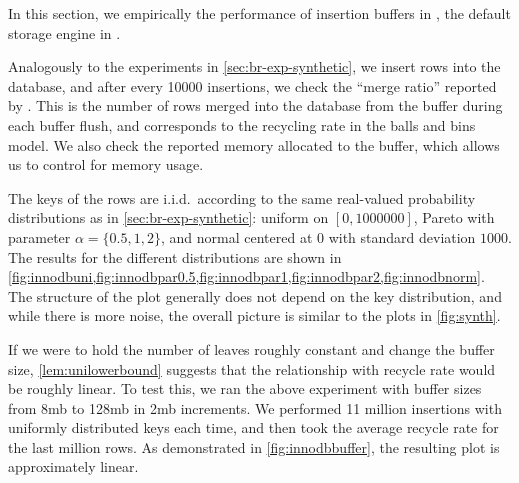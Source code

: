 In this section, we empirically  the performance of insertion buffers in
\innodb{}, the default storage engine in \mysql{}.

Analogously to the experiments in \cref{sec:br-exp-synthetic}, we insert rows into
the \mysql{} database, and after every 10000 insertions, we check the ``merge
ratio'' reported by \innodb{}.  This is the number of rows merged into the
database from the buffer during each buffer flush, and corresponds to the
recycling rate in the balls and bins model. We also check the reported memory
allocated to the buffer, which allows us to control for memory usage. 



The keys of the rows are i.i.d.\ according to the same real-valued probability
distributions as in \cref{sec:br-exp-synthetic}: uniform on $[0,1000000]$, Pareto
with parameter $\alpha = \{0.5,1,2\}$, and normal centered at 0 with standard
deviation $1000$. The results for the different distributions are shown in
\cref{fig:innodbuni,fig:innodbpar0.5,fig:innodbpar1,fig:innodbpar2,fig:innodbnorm}.
The structure of the plot generally does not depend on the key distribution,
and while there is more noise, the overall picture is similar to the plots in
\cref{fig:synth}. 

If we were to hold the number of leaves roughly constant and change the buffer
size, \cref{lem:unilowerbound} suggests that the relationship with recycle rate
would be roughly linear. To test this, we ran the above experiment with buffer
sizes from 8mb to 128mb in 2mb increments. We performed 11 million insertions
with uniformly distributed keys each time, and then took the average recycle
rate for the last million rows. As demonstrated in \cref{fig:innodbbuffer}, the
resulting plot is approximately linear.

